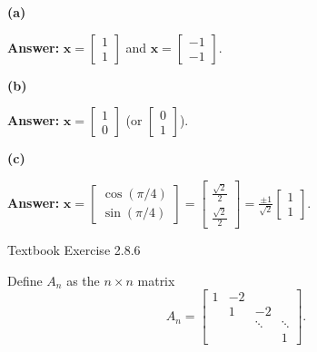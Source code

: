 \documentclass[reqno, answers]{exam}
\begin{document}
\begin{questions}
\begin{solution}
\textbf{(a)}

\textbf{Answer:} $\mathbf{x} = \begin{bmatrix} 1 \\ 1 \end{bmatrix}$ and $\mathbf{x} = \begin{bmatrix} -1 \\ -1 \end{bmatrix}$.

\textbf{(b)}

\textbf{Answer:} $\mathbf{x} = \begin{bmatrix} 1 \\ 0 \end{bmatrix}$ (or $\begin{bmatrix} 0 \\ 1 \end{bmatrix}$).

\textbf{(c)}

\textbf{Answer:} $\mathbf{x} = \begin{bmatrix} \cos(\pi/4) \\ \sin(\pi/4) \end{bmatrix} = \begin{bmatrix} \frac{\sqrt{2}}{2} \\ \frac{\sqrt{2}}{2} \end{bmatrix} = \frac{\pm 1}{\sqrt{2}}\begin{bmatrix} 1 \\ 1 \end{bmatrix}$.
\end{solution}

\question Textbook Exercise 2.8.6

Define $A_n$ as the $n \times n$ matrix
\[
A_n = \begin{bmatrix} 1 & -2 & & \\ & 1 & -2 & \\ & & \ddots & \ddots \\ & & & 1 \end{bmatrix}.
\]
\end{questions}
\end{document}

